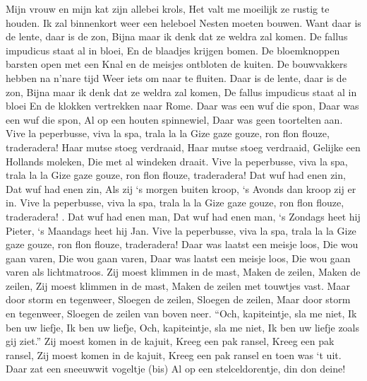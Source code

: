 \documentclass{article}
\begin{document}
\begin{songs}{}
Mijn vrouw en mijn kat zijn allebei krols,
Het valt me moeilijk ze rustig te houden.
Ik zal binnenkort weer een heleboel
Nesten moeten bouwen. 
\endverse
\beginverse*
Want daar is de lente, daar is de zon,
Bijna maar ik denk dat ze weldra zal komen.
De fallus impudicus staat al in bloei,
En de blaadjes krijgen bomen.
\endverse
\beginverse*
De bloemknoppen barsten open met een 
Knal en de meisjes ontbloten de kuiten.
De bouwvakkers hebben na n’nare tijd
Weer iets om naar te fluiten. 
\endverse
\beginverse*
Daar is de lente, daar is de zon,
Bijna maar ik denk dat ze weldra zal komen,
De fallus impudicus staat al in bloei
En de klokken vertrekken naar Rome. 
\endverse
\endsong
{}
\beginverse
Daar was een wuf die spon,
Daar was een wuf die spon,
Al op een houten spinnewiel,
Daar was geen toortelten aan.
Vive la peperbusse, viva la spa, trala la la
Gize gaze gouze, ron flon flouze, traderadera!
\endverse
\beginverse
Haar mutse stoeg verdraaid,
Haar mutse stoeg verdraaid,
Gelijke een Hollands moleken,
Die met al windeken draait.
Vive la peperbusse, viva la spa, trala la la
Gize gaze gouze, ron flon flouze, traderadera!
\endverse
\beginverse
Dat wuf had enen zin,
Dat wuf had enen zin,
Als zij ‘s morgen buiten kroop,
‘s Avonds dan kroop zij er in. 
Vive la peperbusse, viva la spa, trala la la
Gize gaze gouze, ron flon flouze, traderadera!
\endverse
{}.	Dat wuf had enen man,
Dat wuf had enen man,
‘s Zondags heet hij Pieter,
‘s Maandags heet hij Jan. 
Vive la peperbusse, viva la spa, trala la la
Gize gaze gouze, ron flon flouze, traderadera!
\endverse
\endsong
{}
\beginverse
Daar was laatst een meisje loos, 
Die wou gaan varen,
Die wou gaan varen,
Daar was laatst een meisje loos,
Die wou gaan varen als lichtmatroos.
\endverse
\beginverse
Zij moest klimmen in de mast,
Maken de zeilen,
Maken de zeilen,
Zij moest klimmen in de mast,
Maken de zeilen met touwtjes vast.
\endverse
\beginverse
Maar door storm en tegenweer,
Sloegen de zeilen,
Sloegen de zeilen,
Maar door storm en tegenweer,
Sloegen de zeilen van boven neer. 
\endverse
\beginverse
“Och, kapiteintje, sla me niet,
Ik ben uw liefje,
Ik ben uw liefje,
Och, kapiteintje, sla me niet,
Ik ben uw liefje zoals gij ziet.”
\endverse
\beginverse
Zij moest komen in de kajuit,
Kreeg een pak ransel,
Kreeg een pak ransel,
Zij moest komen in de kajuit,
Kreeg een pak ransel en toen was ‘t uit. 
\endverse
\endsong
{}
\beginverse*
Daar zat een sneeuwwit vogeltje (bis)
Al op een stelceldorentje, din don deine!

\end{songs}
\end{document}
